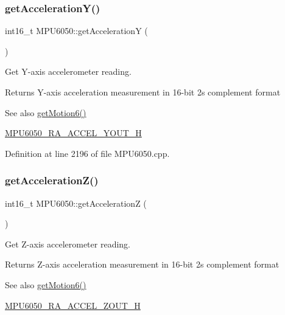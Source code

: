 \subsubsection{\texorpdfstring{getAccelerationY()}{getAccelerationY()}}
{\footnotesize\ttfamily int16\+\_\+t M\+P\+U6050\+::get\+AccelerationY (\begin{DoxyParamCaption}{ }\end{DoxyParamCaption})}

Get Y-\/axis accelerometer reading. \begin{DoxyReturn}{Returns}
Y-\/axis acceleration measurement in 16-\/bit 2\textquotesingle{}s complement format 
\end{DoxyReturn}
\begin{DoxySeeAlso}{See also}
\mbox{\hyperlink{classMPU6050_a574d3093dc131e4251a9b37adf208ca7}{get\+Motion6()}} 

\mbox{\hyperlink{MPU6050_8h_accc9b8669e7b799c8630e8a84cd24692}{M\+P\+U6050\+\_\+\+R\+A\+\_\+\+A\+C\+C\+E\+L\+\_\+\+Y\+O\+U\+T\+\_\+H}} 
\end{DoxySeeAlso}


Definition at line 2196 of file M\+P\+U6050.\+cpp.


\begin{DoxyCode}{0}

\end{DoxyCode}
\mbox{\label{classMPU6050_acf5f5a20c10d99a1bdedf139f897bfdf}} 
\subsubsection{\texorpdfstring{getAccelerationZ()}{getAccelerationZ()}}
{\footnotesize\ttfamily int16\+\_\+t M\+P\+U6050\+::get\+AccelerationZ (\begin{DoxyParamCaption}{ }\end{DoxyParamCaption})}

Get Z-\/axis accelerometer reading. \begin{DoxyReturn}{Returns}
Z-\/axis acceleration measurement in 16-\/bit 2\textquotesingle{}s complement format 
\end{DoxyReturn}
\begin{DoxySeeAlso}{See also}
\mbox{\hyperlink{classMPU6050_a574d3093dc131e4251a9b37adf208ca7}{get\+Motion6()}} 

\mbox{\hyperlink{MPU6050_8h_a2244ed0bf9c94ab5cde2bba541bfa22f}{M\+P\+U6050\+\_\+\+R\+A\+\_\+\+A\+C\+C\+E\+L\+\_\+\+Z\+O\+U\+T\+\_\+H}} 
\end{DoxySeeAlso}


